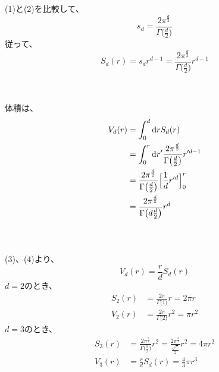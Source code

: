 \documentclass[dvipdfmx,a4paper]{jsarticle}
\begin{document}
\subsection{}
(1)と(2)を比較して、
$$
s_d = \frac{2\pi^{\frac{d}{2}}}{\Gamma\bigl(\frac{d}{2}\bigr)}
$$
従って、
$$
S_d(r) = s_dr^{d-1} = \frac{2\pi^{\frac{d}{2}}}{\Gamma\bigl(\frac{d}{2}\bigr)}r^{d-1}
$$
\\
\subsection{}
体積は、
\begin{align*}
V_d(r) &= \int_0^d \mathrm{d}rS_d(r)\\ 
&= \int_0^r \mathrm{d}r'\frac{2\pi^{\frac{d}{2}}}{\Gamma\bigl(\frac{d}{2}\bigr)}r'^{d-1}\\
&= \frac{2\pi^{\frac{d}{2}}}{\Gamma\bigl(\frac{d}{2}\bigr)}\Bigl[\frac{1}{d}r'^d\Bigr]_0^r\\
&= \frac{2\pi^{\frac{d}{2}}}{\Gamma\bigl(d\frac{d}{2}\bigr)}r^d
\end{align*}
\\
\subsection{}
(3)、(4)より、$$V_d(r) = \frac{r}{d}S_d(r)$$
$d = 2$のとき、
\begin{align*}
S_2(r) &= \frac{2\pi}{\Gamma\bigl(1\bigr)}r = 2\pi r\\
V_2(r) &= \frac{2\pi}{\Gamma\bigl(2\bigr)}r^2 = \pi r^2
\end{align*}
$d = 3$のとき、
\begin{align*}
S_3(r) &= \frac{2\pi^{\frac{3}{2}}}{\Gamma\bigl(\frac{3}{2}\bigr)}r^{2} = \frac{2\pi^{\frac{3}{2}}}{\frac{\sqrt{\pi}}{2}}r^{2} = 4\pi r^2\\
V_3(r) &= \frac{r}{d}S_d(r) = \frac{4}{3}\pi r^3
\end{align*}
\end{document}

